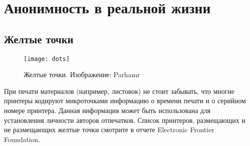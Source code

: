 \chapter{Анонимность в реальной жизни}
\section{Желтые точки}
\begin{wrapfigure}[9]{r}{0.25\linewidth}
\texttt{[image: dots]}
\caption{Желтые точки. Изображение: Parhamr}
\end{wrapfigure}
При печати материалов (например, листовок) не стоит забывать, что многие принтеры  кодируют микроточками информацию о времени печати и о серийном номере принтера\cite{eff_dots}. Данная информация может быть использована для установления  личности авторов отпечатков. Список принтеров, размещающих и не размещающих желтые точки смотрите в отчете Electronic Frontier Foundation\cite{eff_list}.
